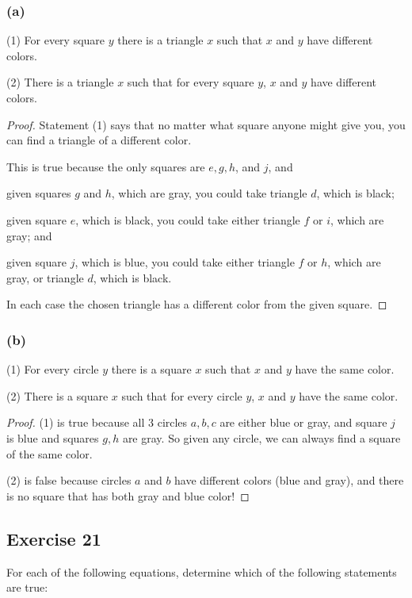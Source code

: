 \documentclass[14pt]{extarticle}
\begin{document}
\subsubsection{(a)}
(1) For every square $y$ there is a triangle $x$ such that $x$ and $y$ have different colors.

(2) There is a triangle $x$ such that for every square $y$, $x$ and $y$ have different colors.

\begin{proof}
Statement (1) says that no matter what square anyone might give you, you can find a triangle of a different color.

This is true because the only squares are $e, g, h$, and $j$, and

given squares $g$ and $h$, which are gray, you could take triangle $d$, which is black; 

given square $e$, which is black, you could take either triangle $f$ or $i$, which are gray; and 

given square $j$, which is blue, you could take either triangle $f$ or $h$, which are gray, or triangle $d$, which is black. 

In each case the chosen triangle has a different color from the given square.
\end{proof}

\subsubsection{(b)}
(1) For every circle $y$ there is a square $x$ such that $x$ and $y$ have the same color.

(2) There is a square $x$ such that for every circle $y$, $x$ and $y$ have the same color.

\begin{proof}
(1) is true because all 3 circles $a, b, c$ are either blue or gray, and square $j$ is blue and squares $g, h$ are gray. So given any circle, we can always find a square of the same color.

(2) is false because circles $a$ and $b$ have different colors (blue and gray), and there is no square that has both gray and blue color!
\end{proof}

\subsection{Exercise 21}
For each of the following equations, determine which of the following statements are true:
\end{document}

